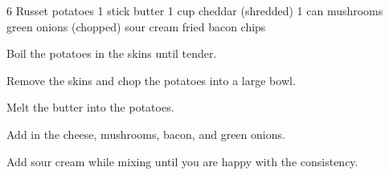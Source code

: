 \dishtype{\side}
\begin{ingreds}
    6 Russet potatoes
    1 stick butter
    1 cup cheddar (shredded)
    1 can mushrooms
    green onions (chopped)
    sour cream
    fried bacon chips
\end{ingreds}
\begin{method}
    Boil the potatoes in the skins until tender.\par
    Remove the skins and chop the potatoes into a large bowl.\par
    Melt the butter into the potatoes.\par
    Add in the cheese, mushrooms, bacon, and green onions.\par
    Add sour cream while mixing until you are happy with the consistency.
\end{method}